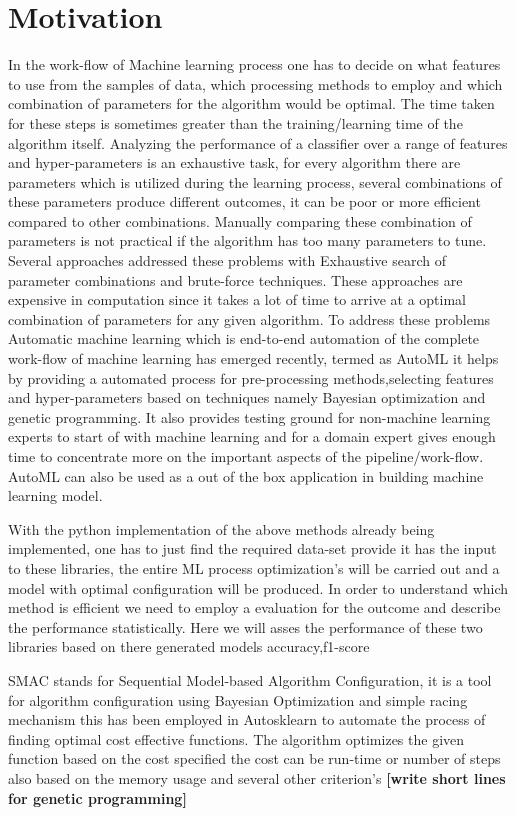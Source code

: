 \section{Motivation}
In the work-flow of Machine learning process one has to decide on what features to use from the samples of data, which processing methods to employ and which combination of parameters for the algorithm would be optimal. The time taken for these steps is sometimes greater than the training/learning time of the algorithm itself. 
Analyzing the performance of a classifier over a range of features and hyper-parameters is an exhaustive task, for every algorithm there are parameters  which is utilized during the learning process, several combinations of these parameters produce different outcomes, it can be poor or more efficient compared to other combinations. Manually comparing these combination of parameters is not practical if the algorithm has too many parameters to tune. Several approaches addressed these problems with Exhaustive search of parameter combinations and brute-force techniques. These approaches are expensive in computation since it takes a lot of time to arrive at a optimal combination of parameters for any given algorithm. To address these problems Automatic machine learning which is end-to-end automation of the complete work-flow of machine learning has emerged recently, termed as AutoML\cite{autoML} it helps by providing a automated process for pre-processing methods,selecting features and hyper-parameters based on techniques namely Bayesian optimization and genetic programming. It also provides testing ground for non-machine learning experts to start of with machine learning and for a domain expert gives enough time to concentrate more on the important aspects of the pipeline/work-flow. AutoML can also be used as a out of the box application in building machine learning model.

With the python implementation of the above methods already being implemented, one has to just find the required data-set provide it has the input to these libraries, the entire ML process optimization's will be carried out and a model with optimal configuration will be produced.
In order to understand which method is efficient we need to employ a evaluation for the outcome and describe the performance statistically. Here we will asses the performance of these two libraries based on there generated models accuracy,f1-score 

SMAC\cite{smac-2017} stands for Sequential Model-based Algorithm Configuration, it is a tool for algorithm configuration using Bayesian Optimization and simple racing mechanism this has been employed in Autosklearn\cite{autosklearn} to automate the process of finding optimal cost effective functions. The algorithm optimizes the given function based on the cost specified the cost can be run-time or number of steps also based on the memory usage and several other criterion's \textbf{[write short lines for genetic programming]}


